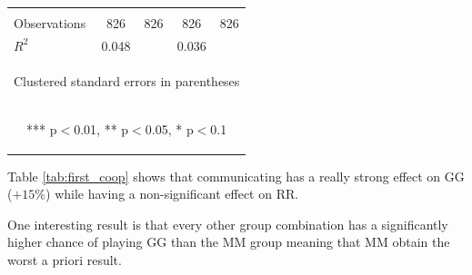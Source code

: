 \documentclass{article} %
\begin{document}
\begin{table}[H]
\begin{center}
\begin{tabular}{lcccc}
\vspace{4pt} & \begin{footnotesize}\end{footnotesize} & \begin{footnotesize}\end{footnotesize} & \begin{footnotesize}\end{footnotesize} & \begin{footnotesize}\end{footnotesize} \\
Observations & 826 & 826 & 826 & 826 \\
 $R^2$ & 0.048 &  & 0.036 &  \\ \hline

\multicolumn{5}{c}{\begin{footnotesize} Clustered standard errors in parentheses\end{footnotesize}} \\
\multicolumn{5}{c}{\begin{footnotesize} *** p$<$0.01, ** p$<$0.05, * p$<$0.1\end{footnotesize}} \\
\end{tabular}
\end{center}


\end{table}


Table \ref{tab:first_coop} shows that communicating has a really strong effect on GG ($+15\%$) while having a non-significant effect on RR.

One interesting result is that every other group combination has a significantly higher chance of playing GG than the MM group meaning that MM obtain the worst a priori result.
\end{document}
